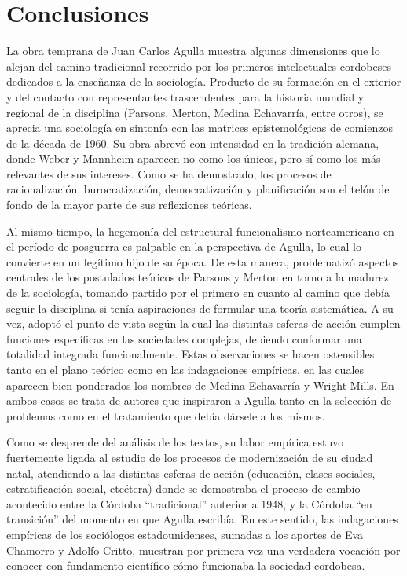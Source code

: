 \section{Conclusiones}

La obra temprana de Juan Carlos Agulla muestra algunas dimensiones que lo alejan del camino tradicional recorrido por los primeros intelectuales cordobeses dedicados a la enseñanza de la sociología. Producto de su formación en el exterior y del contacto con representantes trascendentes para la historia mundial y regional de la disciplina (Parsons, Merton, Medina Echavarría, entre otros), se aprecia una sociología en sintonía con las matrices epistemológicas de comienzos de la década de 1960. Su obra abrevó con intensidad en la tradición alemana, donde Weber y Mannheim aparecen no como los únicos, pero sí como los más relevantes de sus intereses. Como se ha demostrado, los procesos de racionalización, burocratización, democratización y planificación son el telón de fondo de la mayor parte de sus reflexiones teóricas.

Al mismo tiempo, la hegemonía del estructural-funcionalismo norteamericano en el período de posguerra es palpable en la perspectiva de Agulla, lo cual lo convierte en un legítimo hijo de su época. De esta manera, problematizó aspectos centrales de los postulados teóricos de Parsons y Merton en torno a la madurez de la sociología, tomando partido por el primero en cuanto al camino que debía seguir la disciplina si tenía aspiraciones de formular una teoría sistemática. A su vez, adoptó el punto de vista según la cual las distintas esferas de acción cumplen funciones específicas en las sociedades complejas, debiendo conformar una totalidad integrada funcionalmente. Estas observaciones se hacen ostensibles tanto en el plano teórico como en las indagaciones empíricas, en las cuales aparecen bien ponderados los nombres de Medina Echavarría y Wright Mills. En ambos casos se trata de autores que inspiraron a Agulla tanto en la selección de problemas como en el tratamiento que debía dársele a los mismos.

Como se desprende del análisis de los textos, su labor empírica estuvo fuertemente ligada al estudio de los procesos de modernización de su ciudad natal, atendiendo a las distintas esferas de acción (educación, clases sociales, estratificación social, etcétera) donde se demostraba el proceso de cambio acontecido entre la Córdoba \enquote{tradicional} anterior a 1948, y la Córdoba \enquote{en transición} del momento en que Agulla escribía. En este sentido, las indagaciones empíricas de los sociólogos estadounidenses, sumadas a los aportes de Eva Chamorro y Adolfo Critto, muestran por primera vez una verdadera vocación por conocer con fundamento científico cómo funcionaba la sociedad cordobesa.

